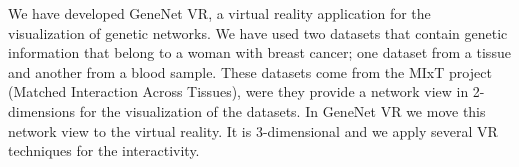 We have developed GeneNet VR, a virtual reality application for the visualization of genetic networks. We have used two datasets that contain genetic information that belong to a woman with breast cancer; one dataset from a tissue and another from a blood sample. These datasets come from the MIxT project (Matched Interaction Across Tissues), were they provide a network view in 2-dimensions for the visualization of the datasets. In GeneNet VR we move this network view to the virtual reality. It is 3-dimensional and we apply several VR techniques for the interactivity.
